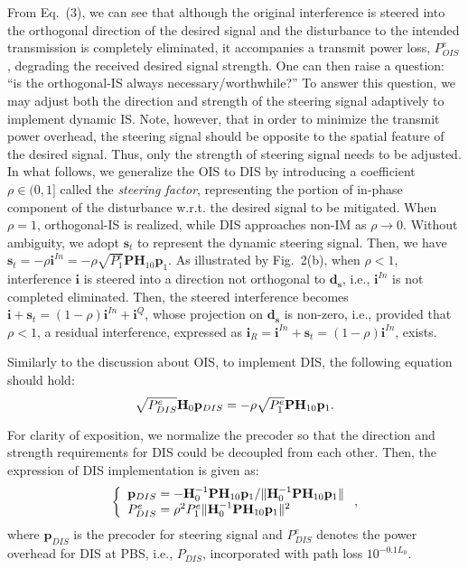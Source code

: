 \documentclass[10pt, conference, letterpaper]{IEEEtran}
\begin{document}
From Eq.~(3), we can see that although the original interference is
steered into the orthogonal direction of the desired signal and
the disturbance to the intended transmission is completely eliminated,
it accompanies a transmit power loss, $P^{e}_{OIS}$,
degrading the received desired signal strength.
One can then raise a question: ``is the orthogonal-IS always necessary/worthwhile?''
To answer this question, we may adjust both the direction and
strength of the steering signal adaptively to implement dynamic IS.
Note, however, that in order to minimize the transmit power overhead,
the steering signal should be opposite to the spatial feature of the desired signal.
Thus, only the strength of steering signal needs to be adjusted.
In what follows, we generalize the OIS to DIS by
introducing a coefficient $\rho\in (0,1]$ called the \textit{steering factor},
representing the portion of in-phase component of the disturbance
w.r.t. the desired signal to be mitigated.
When $\rho=1$, orthogonal-IS is realized,
while DIS approaches non-IM as $\rho\rightarrow 0$.
Without ambiguity, we adopt $\mathbf{s}_{t}$ to represent the dynamic steering signal.
Then, we have
$\mathbf{s}_{t}=-\rho\mathbf{i}^{In}=-\rho\sqrt{P^{e}_{1}}\mathbf{P}\mathbf{H}_{10}\mathbf{p}_{1}$.
As illustrated by Fig.~2(b), when $\rho<1$, interference $\mathbf{i}$ is steered into a direction
not orthogonal to $\mathbf{d}_{\mathbf{s}}$,
i.e., $\mathbf{i}^{In}$ is not completed eliminated.
Then, the steered interference becomes $\mathbf{i}+\mathbf{s}_{t}=(1-\rho)\mathbf{i}^{In}+\mathbf{i}^{Q}$,
whose projection on $\mathbf{d}_{\mathbf{s}}$ is non-zero,
i.e., provided that $\rho<1$, a residual interference,
expressed as $\mathbf{i}_{R}=\mathbf{i}^{In}+\mathbf{s}_{t}=(1-\rho)\mathbf{i}^{In}$, exists.

Similarly to the discussion about OIS, to implement DIS, the following equation should hold:
\begin{equation}
\vspace{-0.05in}
\sqrt{P^{e}_{DIS}}\mathbf{H}_{0}\mathbf{p}_{DIS}=-\rho\sqrt{P^{e}_{1}}\mathbf{P}\mathbf{H}_{10}\mathbf{p}_{1}.
\end{equation}

For clarity of exposition, we normalize the precoder so that the direction and strength requirements for DIS
could be decoupled from each other. Then, the expression of DIS implementation is given as:
\begin{equation}
\vspace*{-0.05in}
\left\{
\begin{array}{l}
\mathbf{p}_{DIS}=-\mathbf{H}^{-1}_{0}\mathbf{P}\mathbf{H}_{10}\mathbf{p}_{1}/
\|\mathbf{H}^{-1}_{0}\mathbf{P}\mathbf{H}_{10}\mathbf{p}_{1}\|\\
P^{e}_{DIS}=\rho^{2}P^{e}_{1}\|\mathbf{H}^{-1}_{0}\mathbf{P}\mathbf{H}_{10}\mathbf{p}_{1}\|^2
\end{array}
\right.,
\end{equation}
where $\mathbf{p}_{DIS}$ is the precoder for steering signal and
$P^{e}_{DIS}$ denotes the power overhead for DIS at PBS, i.e., $P_{DIS}$,
incorporated with path loss $10^{-0.1L_{0}}$.
\end{document}
